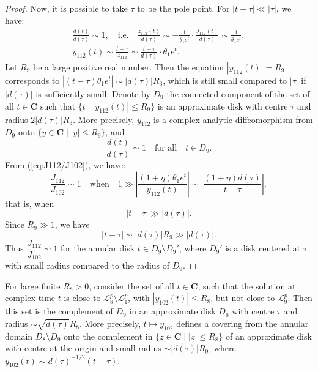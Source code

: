 \begin{proof}
 Now, it is possible to take $\tau$ to be the pole point.
 For $|t-\tau|\ll|\tau|$, we have:
 \begin{gather*}
 \frac{d(t)}{d(\tau)}\sim1,
 \quad\text{i.e.}\quad
 \frac{z_{112}(t)}{d(\tau)}\sim-\frac{1}{\theta_1 e^t}\cdot\frac{J_{112}(t)}{d(\tau)}\sim\frac{1}{\theta_1 e^t},
 \\
 y_{112}(t)\sim\frac{t-\tau}{z_{112}}\sim\frac{t-\tau}{d(\tau)}\cdot \theta_1e^t.
 \end{gather*}
 Let $R_9$ be a large positive real number.
 Then the equation $|y_{112}(t)|=R_9$ corresponds to $|(t-\tau)\theta_1 e^t|\sim|d(\tau)|R_3$, which is still small compared to $|\tau|$ if $|d(\tau)|$ is sufficiently small.
 Denote by $D_9$ the connected component of the set of all $t\in\mathbf{C}$ such that $\{t\mid |y_{112}(t)|\le R_9\}$ is an approximate disk with centre $\tau$ and radius $2|d(\tau)|R_3$.
More precisely, $y_{112}$ is a complex analytic diffeomorphism from $D_9$ onto $\{y\in\mathbf{C}\mid|y|\le R_9\}$, and
$$
\frac{d(t)}{d(\tau)}\sim1
\quad\text{for all}\quad
t\in D_9.
$$
From (\ref{eq:J112/J102}), we have:
$$
\frac{J_{112}}{J_{102}} \sim 1
\quad
\text{when}
\quad
1
\gg
\left|\frac{(1+\eta)\theta_1 e^t}{y_{112}(t)}\right|
\sim
\left| \frac{(1+\eta) d(\tau)}{t-\tau}   \right|,
$$
that is, when
$$
|t-\tau|\gg|d(\tau)|.
$$
Since $R_9\gg1$, we have
$$
|t-\tau|\sim|d(\tau)|R_9\gg|d(\tau)|.
$$
Thus $\dfrac{J_{112}}{J_{102}}\sim1$ for the annular disk $t\in D_9\setminus D_9'$, where $D_9'$ is a disk centered at $\tau$ with small radius compared to the radius of $D_9$.
\end{proof}

\begin{lemma}\label{lemma:L8}
For large finite $R_8>0$, consider the set of all $t\in\mathbf{C}$, such that the solution at complex time $t$ is close to 
$\mathcal{L}_8^p\setminus\mathcal{L}_1^p$, with $|y_{102}(t)|\le R_8$, but not close to $\mathcal{L}_9^p$.
Then this set is the complement of $D_9$ in an approximate disk $D_8$ with centre $\tau$ and radius $\sim\sqrt{d(\tau)}R_8$.
More precisely, $t\mapsto y_{102}$ defines a covering from the annular domain $D_8\setminus D_9$ onto the complement in
$\{ z\in\mathbf{C}\mid |z|\le R_8\}$ of an approximate disk with centre at the origin and small radius $\sim |d(\tau)|R_9$, where
$y_{102}(t)\sim d(\tau)^{-1/2}(t-\tau)$.
 \end{lemma}
 
